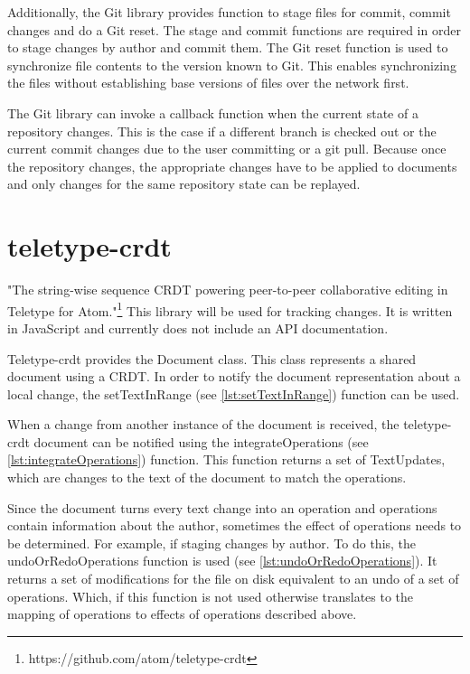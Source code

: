 Additionally, the Git library provides function to stage files for commit, commit changes and do a Git reset. The stage and commit functions are required in order to stage changes by author and commit them. The Git reset function is used to synchronize file contents to the version known to Git. This enables synchronizing the files without establishing base versions of files over the network first.

The Git library can invoke a callback function when the current state of a repository changes. This is the case if a different branch is checked out or the current commit changes due to the user committing or a git pull. Because once the repository changes, the appropriate changes have to be applied to documents and only changes for the same repository state can be replayed.

\section{teletype-crdt}
\label{sec:teletypecrdt}

"The string-wise sequence CRDT powering peer-to-peer collaborative editing in Teletype for Atom."\footnote{https://github.com/atom/teletype-crdt}
This library will be used for tracking changes. It is written in JavaScript and currently does not include an API documentation.


Teletype-crdt provides the Document class. This class represents a shared document using a CRDT. In order to notify the document representation about a local change, the setTextInRange (see \autoref{lst:setTextInRange}) function can be used.

When a change from another instance of the document is received, the teletype-crdt document can be notified using the integrateOperations (see \autoref{lst:integrateOperations}) function. This function returns a set of TextUpdates, which are changes to the text of the document to match the operations.

Since the document turns every text change into an operation and operations contain information about the author, sometimes the effect of operations needs to be determined. For example, if staging changes by author. To do this, the undoOrRedoOperations function is used (see \autoref{lst:undoOrRedoOperations}). It returns a set of modifications for the file on disk equivalent to an undo of a set of operations. Which, if this function is not used otherwise translates to the mapping of operations to effects of operations described above.



